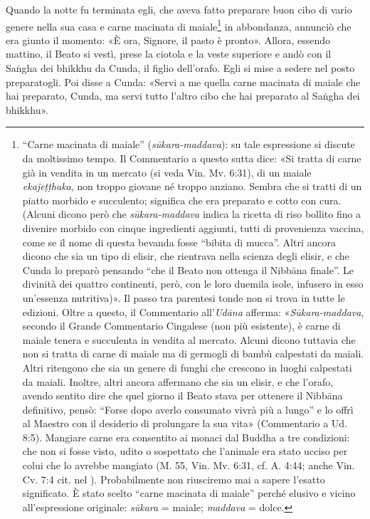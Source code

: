 Quando la notte fu terminata egli, che aveva fatto preparare buon cibo
di vario genere nella sua casa e carne macinata di
maiale\footnote{“Carne macinata di maiale” (\emph{sūkara-maddava}): su tale espressione si discute da moltissimo tempo. Il Commentario a questo sutta dice: «Si tratta di carne già in vendita in un mercato (si veda Vin. Mv. 6:31), di un maiale \emph{ekajeṭṭhaka}, non troppo giovane né troppo anziano. Sembra che si tratti di un piatto morbido e succulento; significa che era preparato e cotto con cura. (Alcuni dicono però che \emph{sūkara-maddava} indica la ricetta di riso bollito fino a divenire morbido con cinque ingredienti aggiunti, tutti di provenienza vaccina, come se il nome di questa bevanda fosse “bibita di mucca”. Altri ancora dicono che sia un tipo di elisir, che rientrava nella scienza degli elisir, e che Cunda lo preparò pensando “che il Beato non ottenga il Nibbāna finale”. Le divinità dei quattro continenti, però, con le loro duemila isole, infusero in esso un’essenza nutritiva)». Il passo tra parentesi tonde non si trova in tutte le edizioni. Oltre a questo, il Commentario all’\emph{Udāna} afferma: «\emph{Sūkara-maddava}, secondo il Grande Commentario Cingalese (non più esistente), è carne di maiale tenera e succulenta in vendita al mercato. Alcuni dicono tuttavia che non si tratta di carne di maiale ma di germogli di bambù calpestati da maiali. Altri ritengono che sia un genere di funghi che crescono in luoghi calpestati da maiali. Inoltre, altri ancora affermano che sia un elisir, e che l’orafo, avendo sentito dire che quel giorno il Beato stava per ottenere il Nibbāna definitivo, pensò: “Forse dopo averlo consumato vivrà più a lungo” e lo offrì al Maestro con il desiderio di prolungare la sua vita» (Commentario a Ud. 8:5). Mangiare carne era consentito ai monaci dal Buddha a tre condizioni: che non si fosse visto, udito o sospettato che l’animale era stato ucciso per colui che lo avrebbe mangiato (M. 55, Vin. Mv. 6:31, cf. A. 4:44; anche Vin. Cv. 7:4 cit. nel \hyperlink{cap-13-Devadatta#pag298}{}). Probabilmente non riusciremo mai a sapere l’esatto significato. È stato scelto “carne macinata di maiale” perché elusivo e vicino all’espressione originale: \emph{sūkara} = maiale; \emph{maddava} = dolce.}
in abbondanza, annunciò che era giunto il
momento: «È ora, Signore, il pasto è pronto». Allora, essendo mattino,
il Beato si vestì, prese la ciotola e la veste superiore e andò con il
Saṅgha dei bhikkhu da Cunda, il figlio dell’orafo. Egli si mise a sedere
nel posto preparatogli. Poi disse a Cunda: «Servi a me quella carne
macinata di maiale che hai preparato, Cunda, ma servi tutto l’altro cibo
che hai preparato al Saṅgha dei bhikkhu».


